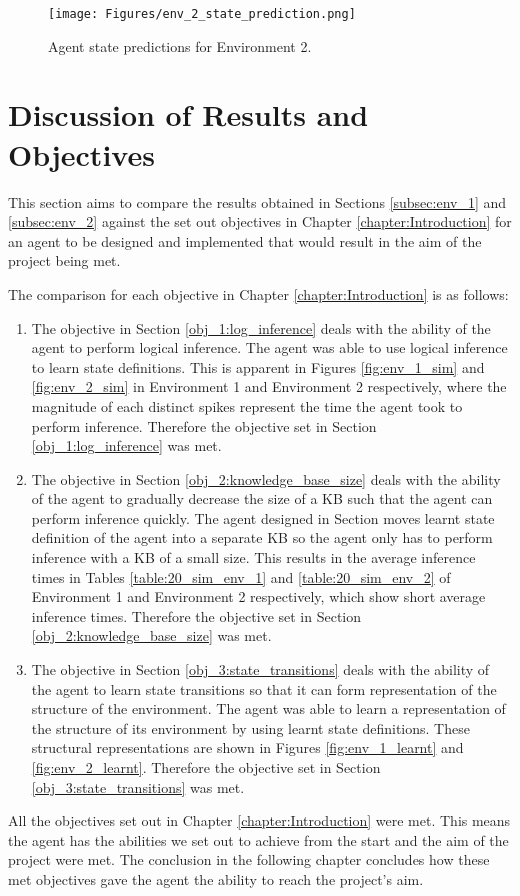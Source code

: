 \begin{figure}[H]
    \centering
    \texttt{[image: Figures/env\_2\_state\_prediction.png]}
    \caption{Agent state predictions for Environment 2.}
    \label{fig:env_2_predict}
\end{figure}

\section{Discussion of Results and Objectives}

This section aims to compare the results obtained in Sections \ref{subsec:env_1} and \ref{subsec:env_2} against the set out objectives in Chapter \ref{chapter:Introduction} for an agent to be designed and implemented that would result in the aim of the project being met.  

The comparison for each objective in Chapter \ref{chapter:Introduction} is as follows:

\begin{enumerate}
 \item The objective in Section \ref{obj_1:log_inference} deals with the ability of the agent to perform logical inference. The agent was able to use logical inference to learn state definitions. This is apparent in Figures \ref{fig:env_1_sim} and \ref{fig:env_2_sim} in Environment 1 and Environment 2 respectively, where the magnitude of each distinct spikes represent the time the agent took to perform inference. Therefore the objective set in Section \ref{obj_1:log_inference} was met.
 \item The objective in Section \ref{obj_2:knowledge_base_size} deals with the ability of the agent to gradually decrease the size of a KB such that the agent can perform inference quickly. The agent designed in Section \label{sec:kb_agentz} moves learnt state definition of the agent into a separate KB so the agent only has to perform inference with a KB of a small size. This results in the average inference times in Tables \ref{table:20_sim_env_1} and \ref{table:20_sim_env_2} of Environment 1 and Environment 2 respectively, which show short average inference times. Therefore the objective set in Section \ref{obj_2:knowledge_base_size} was met.
 
 \item The objective in Section \ref{obj_3:state_transitions} deals with the ability of the agent to learn state transitions so that it can form representation of the structure of the environment. The agent was able to learn a representation of the structure of its environment by using learnt state definitions. These structural representations are shown in Figures \ref{fig:env_1_learnt} and \ref{fig:env_2_learnt}. Therefore the objective set in Section \ref{obj_3:state_transitions} was met.
\end{enumerate}

All the objectives set out in Chapter \ref{chapter:Introduction} were met. This means the agent has the abilities we set out to achieve from the start and the aim of the project were met. The conclusion in the following chapter concludes how these met objectives gave the agent the ability to reach the project's aim.